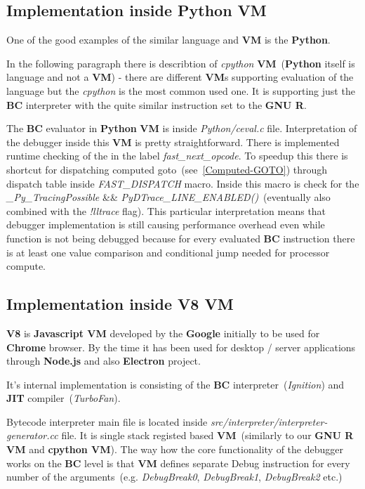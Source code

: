 \documentclass[thesis=M,english]{FITthesis}[2018/10/20]
\begin{document}
\subsection{Implementation inside Python VM}

One of the good examples of the similar language and \textbf{VM} is the \textbf{Python}.

In the following paragraph there is describtion of \textit{cpython} \textbf{VM}~(\textbf{Python} itself is language and not a \textbf{VM}) - there are different \textbf{VM}s supporting evaluation of the language but the \textit{cpython} is the most common used one. It is supporting just the \textbf{BC} interpreter with the quite similar instruction set to the \textbf{GNU R}.

The \textbf{BC} evaluator in \textbf{Python} \textbf{VM} is inside \textit{Python/ceval.c} file. Interpretation of the debugger inside this \textbf{VM} is pretty straightforward. There is implemented runtime checking of the in the label \textit{fast{\_}next{\_}opcode}. To speedup this there is shortcut for dispatching computed goto~(see~\ref{Computed-GOTO}) through dispatch table inside \textit{FAST{\_}DISPATCH} macro. Inside this macro is check for the \textit{{\!}{\_}Py{\_}TracingPossible} {\&\&} \textit{{\!}PyDTrace{\_}LINE{\_}ENABLED()}~(eventually also combined with the \textit{!lltrace} flag). This particular interpretation means that debugger implementation is still causing performance overhead even while function is not being debugged because for every evaluated \textbf{BC} instruction there is at least one value comparison and conditional jump needed for processor compute.

\subsection{Implementation inside V8 VM}\label{bcdebug-implementation-in-v8}

\textbf{V8} is \textbf{Javascript VM} developed by the \textbf{Google} initially to be used for \textbf{Chrome} browser. By the time it has been used for desktop / server applications through \textbf{Node.js} and also \textbf{Electron} project.

It's internal implementation is consisting of the \textbf{BC} interpreter~(\textit{Ignition}) and \textbf{JIT} compiler~(\textit{TurboFan}).

Bytecode interpreter main file is located inside \textit{src/interpreter/interpreter-generator.cc} file. It is single stack registed based \textbf{VM}~(similarly to our \textbf{GNU R VM} and \textbf{cpython VM}). The way how the core functionality of the debugger works on the \textbf{BC} level is that \textbf{VM} defines separate Debug instruction for every number of the arguments~(e.g. \textit{DebugBreak0}, \textit{DebugBreak1}, \textit{DebugBreak2} etc.)
\end{document}
